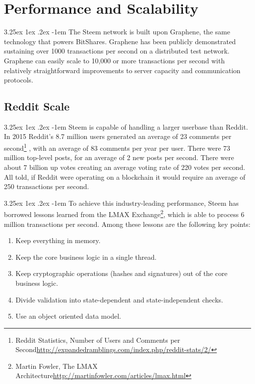 \documentclass{article}
\makeatletter
\renewcommand\paragraph{\@startsection{paragraph}{5}{\z@}%
  {3.25ex \@plus1ex \@minus.2ex}%
  {-1em}%
  {\normalfont\normalsize\bfseries}}
\makeatother
\begin{document}
    \section{Performance and Scalability}

        \paragraph{}
            The Steem network is built upon Graphene, the same technology
that powers BitShares. Graphene has been publicly demonstrated sustaining
over 1000 transactions per second on a distributed test network. Graphene
can easily scale to 10,000 or more transactions per second with relatively
straightforward improvements to server capacity and communication
protocols.

        \subsection{Reddit Scale}

            \paragraph{}
                Steem is capable of handling a larger userbase than Reddit.
In 2015 Reddit's 8.7 million users generated an average of 23 comments per
second\footnote{Reddit Statistics, Number of Users and Comments per
Second\newline\url{http://expandedramblings.com/index.php/reddit-stats/2/}}
, with an average of 83 comments per year per user. There were 73 million
top-level posts, for an average of 2 new posts per second. There were about
7 billion up votes creating an average voting rate of 220 votes per second.
All told, if Reddit were operating on a blockchain it would require an
average of 250 transactions per second.

            \paragraph{}
                To achieve this industry-leading performance, Steem has
borrowed lessons learned from the LMAX Exchange\footnote{Martin Fowler, The
LMAX Architecture\newline\url{http://martinfowler.com/articles/lmax.html}},
which is able to process 6 million transactions per second. Among these
lessons are the following key points:

            \begin{enumerate}
                \item Keep everything in memory.
                \item Keep the core business logic in a single thread.
                \item Keep cryptographic operations (hashes and signatures)
out of the core business logic.
                \item Divide validation into state-dependent and
state-independent checks.
                \item Use an object oriented data model.
            \end{enumerate}
\end{document}
